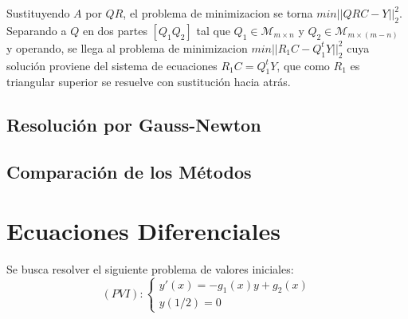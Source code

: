 \documentclass{endm}
\begin{document}
Sustituyendo $A$ por $QR$, el problema de minimizacion se torna $min ||QRC - Y||^2_2$.
Separando a $Q$ en dos partes $[Q_1 Q_2]$ tal que $Q_1 \in \mathcal{M}_{m \times n}$ y
$Q_2 \in \mathcal{M}_{m \times (m-n)}$ y operando, se llega al problema de minimizacion $min ||R_1C - Q_1^tY||^2_2$
cuya solución proviene del sistema de ecuaciones $R_1C = Q_1^tY$, que como $R_1$ es triangular superior se resuelve con
sustitución hacia atrás.




\subsection{Resolución por Gauss-Newton}


\subsection{Comparación de los Métodos}


\section{Ecuaciones Diferenciales}
Se busca resolver el siguiente problema de valores iniciales:
\begin{equation*}
    (PVI):\begin{cases}
        y'(x) = -g_1(x)y + g_2(x) \\
        y(1/2) = 0
    \end{cases}
\end{equation*}

\end{document}
